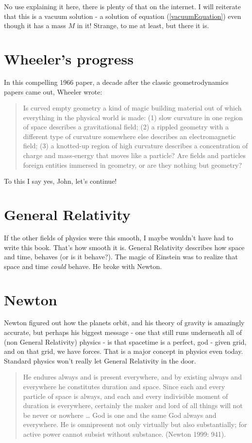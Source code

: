\documentclass[../rzero]{subfiles}
\begin{document}
No use explaining it here, there is plenty of that on the internet. I will reiterate that this is a vacuum solution - a solution of equation (\ref{vacuumEquation}) even though it has a mass $M$ in it! Strange, to me at least, but there it is.

\section{Wheeler's progress}
In this compelling 1966 paper\cite{wheelerCurvedEmptySpaceTime1966}, a decade after the classic geometrodynamics\cite{Misner:1957mt}\cite{Wheeler1957quantumGeo} papers came out, Wheeler wrote:
\begin{quotation}
	Is curved empty geometry a kind of magic building material out of which everything in the physical world is made: (1) slow curvature in one region of space describes a gravitational field; (2) a rippled geometry with a different type of curvature somewhere else describes an electromagnetic field; (3) a knotted-up region of high curvature describes a concentration of charge and mass-energy that moves like a particle? Are fields and particles foreign entities immersed in geometry, or are they nothing but geometry?
\end{quotation}

To this I say yes, John, let's continue!

\section{General Relativity}
If the other fields of physics were this smooth, I maybe wouldn't have had to write this book. That's how smooth it is. General Relativity describes how space and time, behaves (or is it behave?). The magic of Einstein was to realize that space and time \textit{could} behave. He broke with Newton.


\section{Newton}
Newton figured out how the planets orbit, and his theory of gravity is amazingly accurate, but perhaps his biggest message - one that still runs underneath all of (non General Relativity) physics - is that spacetime is a perfect, god - given grid, and on that grid, we have forces. That is a major concept in physics even today. Standard physics won't really let General Relativity in the door.  

\begin{quotation}
	He endures always and is present everywhere, and by existing always and everywhere he constitutes duration and space. Since each and every particle of space is always, and each and every indivisible moment of duration is everywhere, certainly the maker and lord of all things will not be never or nowhere … God is one and the same God always and everywhere. He is omnipresent not only virtually but also substantially; for active power cannot subsist without substance. (Newton 1999: 941).
\end{quotation} 
\end{document}
